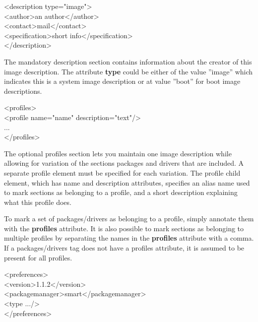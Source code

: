 \begin{Command}{12cm}
<description type="image">\\
\hspace*{1cm}<author>an author</author>\\
\hspace*{1cm}<contact>mail</contact>\\
\hspace*{1cm}<specification>short info</specification>\\
</description>
\end{Command}

The mandatory description section contains information about
the creator of this image description. The attribute \textbf{type}
could be either of the value ''image'' which indicates this is a
system image description or at value ''boot'' for boot image
descriptions.

\begin{Command}{12cm}
<profiles>\\
\hspace*{1cm}<profile name="name" description="text"/>\\
\hspace*{1cm}...\\
</profiles>
\end{Command}

The optional profiles section lets you maintain one image description
while allowing for variation of the sections packages and drivers that are
included. A separate profile element must be specified for each variation.
The profile child element, which has name and description attributes,
specifies an alias name used to mark sections as belonging to a profile,
and a short description explaining what this profile does.

To mark a set of packages/drivers as belonging to a profile, simply
annotate them with the \textbf{profiles} attribute. It is also possible
to mark sections as belonging to multiple profiles by separating the
names in the \textbf{profiles} attribute with a comma.
If a packages/drivers tag does not have a profiles attribute, it is
assumed to be present for all profiles.

\begin{Command}{12cm}
<preferences>\\
\hspace*{1cm}<version>1.1.2</version>\\
\hspace*{1cm}<packagemanager>smart</packagemanager>\\
\hspace*{1cm}<type .../>\\
</preferences>
\end{Command}

